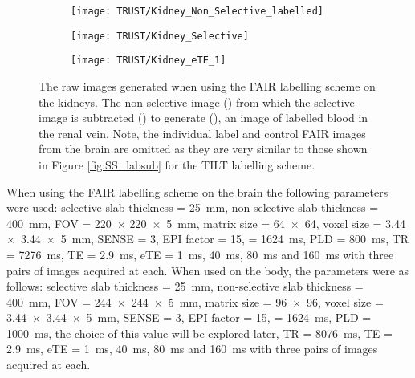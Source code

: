 \begin{figure}[H]
	\centering
	\begin{subfigure}[c]{0.30\textwidth}
		\centering
		\texttt{[image: TRUST/Kidney\_Non\_Selective\_labelled]}
		\caption{}
		\label{fig:RV_nonsel}
	\end{subfigure}
	\hfill
	\begin{subfigure}[c]{0.30\textwidth}
		\centering
		\texttt{[image: TRUST/Kidney\_Selective]}
		\caption{}
		\label{fig:RV_sel}
	\end{subfigure}
	\hfill
	\begin{subfigure}[c]{0.30\textwidth}
		\centering
		\texttt{[image: TRUST/Kidney\_eTE\_1]}
		\caption{}
		\label{fig:RV_diff}
	\end{subfigure}
	\caption{The raw images generated when using the \ac{FAIR} labelling scheme on the kidneys. The non-selective image () from which the selective image is subtracted () to generate (), an image of labelled blood in the renal vein. Note, the individual label and control \ac{FAIR} images from the brain are omitted as they are very similar to those shown in Figure \ref{fig:SS_labsub} for the \ac{TILT} labelling scheme.}
	\label{fig:RV_labsub}
\end{figure}

When using the \ac{FAIR} labelling scheme on the brain the following parameters were used: selective slab thickness = 25~mm, non-selective slab thickness = 400~mm, \ac{FOV} = 220~$\times$ 220~$\times$~5~mm, matrix size = 64~$\times$~64, voxel size = 3.44~$\times$~3.44~$\times$~5~mm, \ac{SENSE} = 3, \ac{EPI} factor = 15, \tone = 1624~ms, \ac{PLD} = 800~ms, \ac{TR} = 7276~ms, \ac{TE} = 2.9~ms, \ac{eTE} = 1~ms, 40~ms, 80~ms and 160~ms with three pairs of images acquired at each. When used on the body, the parameters were as follows: selective slab thickness = 25~mm, non-selective slab thickness = 400~mm, \ac{FOV} = 244~$\times$~244~$\times$~5~mm, matrix size = 96~$\times$~96, voxel size = 3.44~$\times$~3.44~$\times$~5~mm, \ac{SENSE} = 3, \ac{EPI} factor = 15, \tone = 1624~ms, \ac{PLD} = 1000~ms, the choice of this value will be explored later, \ac{TR} = 8076~ms, \ac{TE} = 2.9~ms, \ac{eTE} = 1~ms, 40~ms, 80~ms and 160~ms with three pairs of images acquired at each.

\newpage
